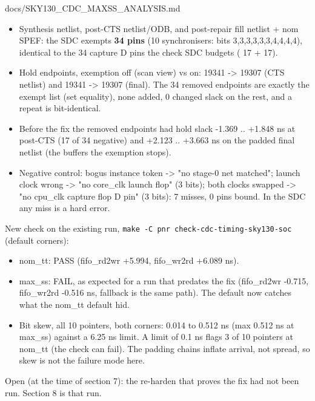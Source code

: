 \begin{relocated}{docs/SKY130_CDC_MAXSS_ANALYSIS.md}
\begin{itemize}
\tightlist
\item
  Synthesis netlist, post-CTS netlist/\allowbreak{}ODB, and post-repair
  fill netlist + nom SPEF: the SDC exempts \textbf{34 pins} (10
  synchronisers: bits 3,3,3,3,3,3,4,4,4,4), identical to the 34 capture
  D pins the check SDC budgets ( 17 + 
  17).
\item
  Hold endpoints, exemption off (scan view) vs on: 19341 -\textgreater{}
  19307 (CTS netlist) and 19341 -\textgreater{} 19307 (final). The 34
  removed endpoints are exactly the exempt list (set equality), none
  added, 0 changed slack on the rest, and a repeat is bit-identical.
\item
  Before the fix the removed endpoints had hold slack -1.369 .. +1.848
  ns at post-CTS (17 of 34 negative) and +2.123 .. +3.663 ns on the
  padded final netlist (the buffers the exemption stops).
\item
  Negative control: bogus instance token -\textgreater{} "no stage-0 net
  matched"; launch clock wrong -\textgreater{} "no core\_clk launch
  flop" (3 bits); both clocks swapped -\textgreater{} "no cpu\_clk
  capture flop D pin" (3 bits): 7 misses, 0 pins bound. In the SDC any
  miss is a hard error.
\end{itemize}

New check on the existing run,
\texttt{make\ -\allowbreak{}C\ pnr\ check-\allowbreak{}cdc-\allowbreak{}timing-\allowbreak{}sky130-\allowbreak{}soc}
(default corners):

\begin{itemize}
\tightlist
\item
  nom\_tt: PASS (fifo\_\allowbreak{}rd2wr +5.994,
  fifo\_\allowbreak{}wr2rd +6.089 ns).
\item
  max\_ss: FAIL, as expected for a run that predates the fix
  (fifo\_\allowbreak{}rd2wr -0.715, fifo\_\allowbreak{}wr2rd -0.516 ns,
   fallback is the same path). The default now catches
  what the nom\_tt default hid.
\item
  Bit skew, all 10 pointers, both corners: 0.014 to 0.512 ns (max
   0.512 ns at max\_ss) against a 6.25 ns limit. A
  limit of 0.1 ns flags 3 of 10 pointers at nom\_tt (the check can
  fail). The padding chains inflate arrival, not spread, so skew is not
  the failure mode here.
\end{itemize}

Open (at the time of section 7): the re-harden that proves the fix had
not been run. Section 8 is that run.


\end{relocated}
